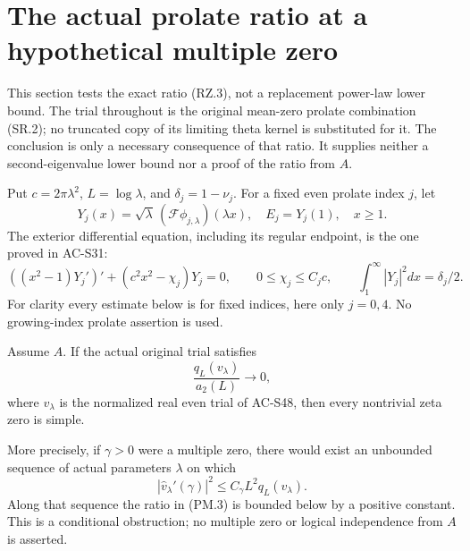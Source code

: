 \section{The actual prolate ratio at a hypothetical multiple zero}
\label{sec:prolate-ratio-multiplicity}

This section tests the exact ratio (RZ.3), not a replacement power-law
lower bound.  The trial throughout is the original mean-zero prolate
combination (SR.2); no truncated copy of its limiting theta kernel is
substituted for it.  The conclusion is only a necessary consequence of
that ratio.  It supplies neither a second-eigenvalue lower bound nor a
proof of the ratio from \(A\).

Put \(c=2\pi\lambda^2\), \(L=\log\lambda\), and
\(\delta_j=1-\nu_j\).  For a fixed even prolate index \(j\), let
\[
 Y_j(x)=\sqrt\lambda\,(\mathcal F\phi_{j,\lambda})(\lambda x),
 \quad E_j=Y_j(1),\quad x\ge1.
 \tag{PM.1}
\]
The exterior differential equation, including its regular endpoint,
is the one proved in AC-S31:
\[
 ((x^2-1)Y_j')'+(c^2x^2-\chi_j)Y_j=0,
 \qquad 0\le\chi_j\le C_jc,
 \qquad\int_1^\infty |Y_j|^2dx=\delta_j/2.
 \tag{PM.2}
\]
For clarity every estimate below is for fixed indices, here only
\(j=0,4\).  No growing-index prolate assertion is used.

\begin{theorem}
\label{AC-S49-ratio-simplicity}
Assume \(A\).  If the actual original trial satisfies
\[
 \frac{q_L(v_\lambda)}{a_2(L)}\longrightarrow0,
 \tag{PM.3}
\]
where \(v_\lambda\) is the normalized real even trial of AC-S48,
then every nontrivial zeta zero is simple.

More precisely, if \(\gamma>0\) were a multiple zero, there would
exist an unbounded sequence of actual parameters \(\lambda\) on which
\[
 |\widehat v_\lambda'(\gamma)|^2
       \le C_\gamma L^2 q_L(v_\lambda).
 \tag{PM.4}
\]
Along that sequence the ratio in (PM.3) is bounded below by a positive
constant.  This is a conditional obstruction; no multiple zero or
logical independence from \(A\) is asserted.
\end{theorem}

